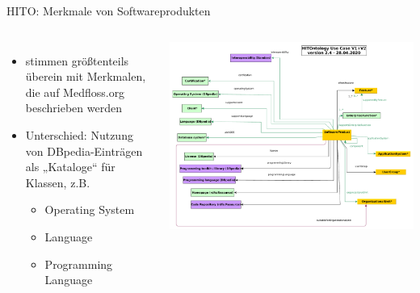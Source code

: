 \documentclass[aspectratio=1610,12pt]{beamer}
\begin{document}
\begin{frame}{HITO: Merkmale von Softwareprodukten}
\begin{columns}
  \begin{itemize}
    \item stimmen größtenteils überein mit Merkmalen, die auf Medfloss.org beschrieben werden
    \item Unterschied: Nutzung von DBpedia-Einträgen als „Kataloge“ für Klassen, z.B.
    \begin{itemize}
      \item Operating System
      \item Language
      \item Programming Language
    \end{itemize}
  \end{itemize}
\includegraphics[width=\textwidth,height=0.9\textheight,keepaspectratio]{img/excerpt2.pdf}
\end{columns}
\end{frame}
\end{document}
